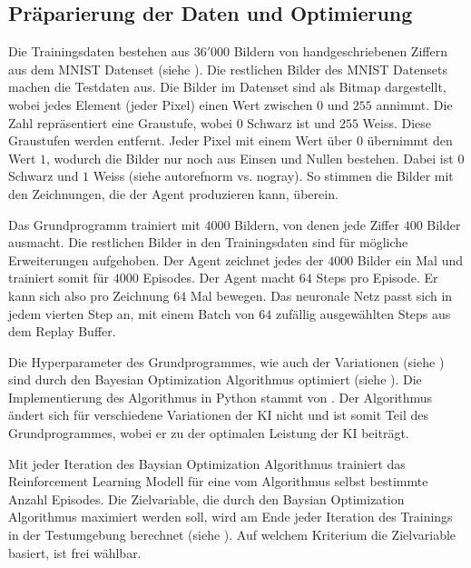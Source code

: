 \subsection{Präparierung der Daten und Optimierung}
\label{sub:m_grund_data}
Die Trainingsdaten bestehen aus $36'000$ Bildern von handgeschriebenen Ziffern
aus dem MNIST Datenset (siehe ). Die restlichen Bilder des
MNIST Datensets machen die Testdaten aus. Die Bilder im Datenset sind als Bitmap
dargestellt, wobei jedes Element (jeder Pixel) einen Wert zwischen $0$ und $255$
annimmt. Die Zahl repräsentiert eine Graustufe, wobei $0$ Schwarz ist und $255$
Weiss. Diese Graustufen werden entfernt. Jeder Pixel mit einem Wert über $0$
übernimmt den Wert $1$, wodurch die Bilder nur noch aus Einsen und Nullen
bestehen. Dabei ist $0$ Schwarz und $1$ Weiss (siehe autoref{norm vs. nogray}).
So stimmen die Bilder mit den Zeichnungen, die der Agent produzieren kann,
überein.


Das Grundprogramm trainiert mit $4000$ Bildern, von denen jede Ziffer $400$
Bilder ausmacht. Die restlichen Bilder in den Trainingsdaten sind für mögliche  
Erweiterungen aufgehoben. Der Agent zeichnet jedes der $4000$ Bilder ein Mal und
trainiert somit für $4000$ Episodes. Der Agent macht $64$ Steps pro Episode. Er
kann sich also pro Zeichnung $64$ Mal bewegen. Das neuronale Netz passt sich in
jedem vierten Step an, mit einem Batch von $64$ zufällig ausgewählten Steps aus
dem Replay Buffer.

Die Hyperparameter des Grundprogrammes, wie auch der Variationen (siehe
) sind durch den Bayesian Optimization Algorithmus optimiert
(siehe ). Die Implementierung des Algorithmus in Python
stammt von \cite{fernando_bayesian_2022}. Der Algorithmus ändert sich für
verschiedene Variationen der KI nicht und ist somit Teil des Grundprogrammes,
wobei er zu der optimalen Leistung der KI beiträgt. 

Mit jeder Iteration des Baysian Optimization Algorithmus trainiert das
Reinforcement Learning Modell für eine vom Algorithmus selbst bestimmte Anzahl
Episodes. Die Zielvariable, die durch den Baysian Optimization Algorithmus
maximiert werden soll, wird am Ende jeder Iteration des Trainings in der
Testumgebung berechnet (siehe ). Auf welchem Kriterium
die Zielvariable basiert, ist frei wählbar.



